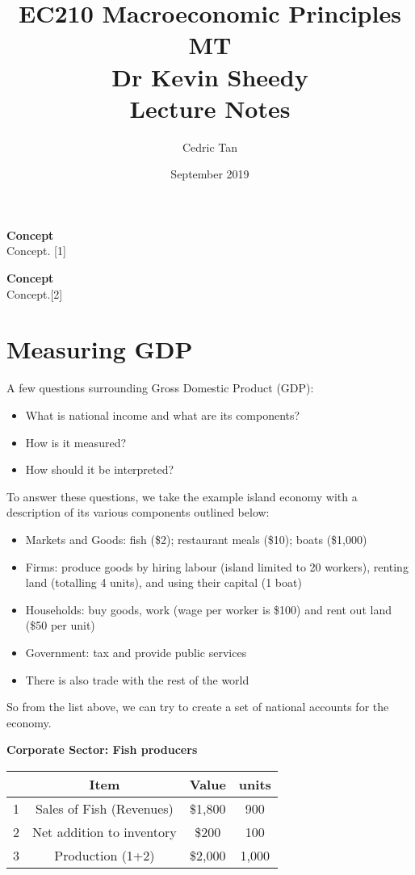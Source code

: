 \documentclass[12pt, letterpaper]{article}
\title{
	{EC210 Macroeconomic Principles MT}\\
	{\large{Dr Kevin Sheedy}}\\
	{\large{Lecture Notes}}
}
\author{Cedric Tan}
\date{September 2019}
\begin{document}
\maketitle
{\small
  \noindent\textbf{Concept}\\
  Concept. \hspace*{\fill}[1]

  \vspace{10pt}
  \noindent\textbf{Concept}\\
  Concept.\hspace*{\fill}[2]

\newpage
\tableofcontents
\newpage

\section{Measuring GDP}
A few questions surrounding Gross Domestic Product (GDP):
\begin{itemize}
	\item What is national income and what are its components?
	\item How is it measured?
	\item How should it be interpreted?
\end{itemize}
To answer these questions, we take the example island economy with a description of its various components outlined below:
\begin{itemize}
	\item Markets and Goods: fish (\$2); restaurant meals (\$10); boats (\$1,000)
	\item Firms: produce goods by hiring labour (island limited to 20 workers), renting land (totalling 4 units), and using their capital (1 boat)
	\item Households: buy goods, work (wage per worker is \$100) and rent out land (\$50 per unit)
	\item Government: tax and provide public services
	\item There is also trade with the rest of the world
\end{itemize}
So from the list above, we can try to create a set of national accounts for the economy.

\vspace{10pt}
\noindent \textbf{Corporate Sector: Fish producers}\\
\begin{center}
	\begin{tabular}{|c|c|c|c|}
	& Item & Value & units\\
	\hline
	1 & Sales of Fish (Revenues) & \$1,800 & 900\\
	\hline
	2 & Net addition to inventory & \$200 & 100\\
	\hline
	3 & Production (1+2) & \$2,000 & 1,000
	\end{tabular}
\end{center}

}
\end{document}
